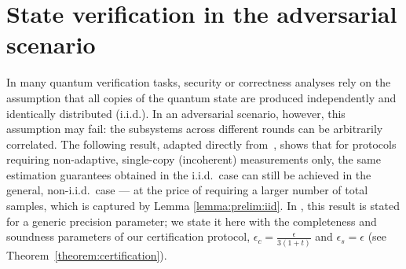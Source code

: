 \documentclass[a4paper,twocolumn,11pt,unpublished]{quantumarticle}
\newif\ifhighlightchanges \highlightchangestrue
\newcommand{\revother}[1]{\ifhighlightchanges{\color{red}#1}\else#1\fi}
\begin{document}
\section{State verification in the adversarial scenario}
\label{section:verification}

In many quantum verification tasks, security or correctness analyses rely on the assumption that all copies of the quantum state are produced independently and identically distributed (i.i.d.).
In an adversarial scenario, however, this assumption may fail: the subsystems across different rounds can be arbitrarily correlated.
The following result, adapted directly from~\cite[Theorem~3]{FKMO24learning}, shows that for protocols requiring non-adaptive, single-copy (incoherent) measurements only, the same estimation guarantees obtained in the i.i.d.\ case can still be achieved in the general, non-i.i.d.\ case — at the price of requiring a larger number of total samples, which is captured by Lemma \ref{lemma:prelim:iid}. \revother{In \cite{FKMO24learning}, this result is stated for a generic precision parameter; we state it here with the completeness and soundness parameters of our certification protocol, $\epsilon_c=\frac{\epsilon}{3(1+t)}$ and $\epsilon_s=\epsilon$ (see Theorem~\ref{theorem:certification}).}
\end{document}
